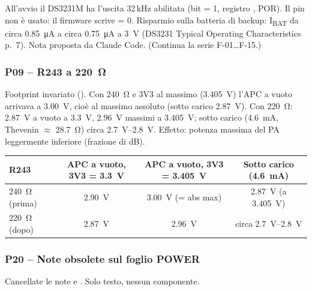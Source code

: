 \begin{tcolorbox}[enhanced,breakable,colback=boxokbg,colframe=boxok,boxrule=0.8pt,left=7pt,right=6pt,top=4pt,bottom=4pt,
  title={\sffamily\bfseries Nota firmware F-16 \textendash{} per il firmwarista (uscita 32 kHz del DS3231M)},fonttitle=\small,coltitle=white,colbacktitle=boxok]
All'avvio il DS3231M ha l'uscita 32\,kHz abilitata (bit  = 1, registro , POR). Il pin non è usato: il firmware scrive  = 0. Risparmio sulla batteria di backup: I\textsubscript{BAT} da circa \SI{0.85}{\micro\ampere} a circa \SI{0.75}{\micro\ampere} a \SI{3}{V} (DS3231 Typical Operating Characteristics p.\ 7). Nota proposta da Claude Code. (Continua la serie F-01\ldots F-15.)
\end{tcolorbox}

\subsubsection{P09 -- R243 a \texorpdfstring{\SI{220}{\ohm}}{220 ohm}}
Footprint invariato (). Con \SI{240}{\ohm} e 3V3 al massimo (\SI{3.405}{V}) l'APC a vuoto arrivava a \SI{3.00}{V}, cioè al massimo assoluto (sotto carico \SI{2.87}{V}). Con \SI{220}{\ohm}: \SI{2.87}{V} a vuoto a \SI{3.3}{V}, \SI{2.96}{V} massimi a \SI{3.405}{V}; sotto carico (\SI{4.6}{\milli\ampere}, Thevenin $\approx$ \SI{28.7}{\ohm}) circa \SIrange{2.7}{2.8}{V}. Effetto: potenza massima del PA leggermente inferiore (frazione di dB).

{\small{}
\begin{tabularx}{\linewidth}{@{}Xccc@{}}
\toprule
\textbf{R243} & \textbf{APC a vuoto, 3V3 = \SI{3.3}{V}} & \textbf{APC a vuoto, 3V3 = \SI{3.405}{V}} & \textbf{Sotto carico (\SI{4.6}{\milli\ampere})}\\
\midrule
\SI{240}{\ohm} (prima) & \SI{2.90}{\volt} & \SI{3.00}{V} (= abs max) & \SI{2.87}{V} (a \SI{3.405}{V})\\
\SI{220}{\ohm} (dopo) & \SI{2.87}{V} & \SI{2.96}{V} & circa \SIrange{2.7}{2.8}{V}\\
\bottomrule
\end{tabularx}}

\subsubsection{P20 -- Note obsolete sul foglio POWER}
Cancellate le note  e . Solo testo, nessun componente.

